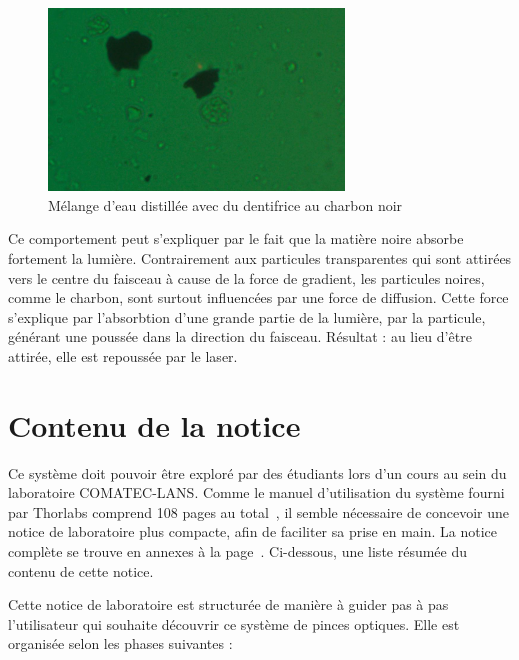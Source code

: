 \begin{figure}[H]
    \begin{center}
        \includegraphics[width=0.7\textwidth]{assets/figures/Notice de laboratoire/dentifrice_charbon.png}
    \end{center}
    \caption{Mélange d'eau distillée avec du dentifrice au charbon noir}
    \label{dentifrice_charbon}
\end{figure}

Ce comportement peut s'expliquer par le fait que la matière noire absorbe fortement la lumière. Contrairement aux particules transparentes qui sont attirées vers le centre du faisceau à cause de la force de gradient, les particules noires, comme le charbon, sont surtout influencées par une force de diffusion. Cette force s'explique par l'absorbtion d'une grande partie de la lumière, par la particule, générant une poussée dans la direction du faisceau. Résultat : au lieu d'être attirée, elle est repoussée par le laser.

\newpage
\section{Contenu de la notice}
Ce système doit pouvoir être exploré par des étudiants lors d'un cours au sein du laboratoire COMATEC-LANS. Comme le manuel d'utilisation du système fourni par Thorlabs comprend 108 pages au total~\cite{manualPortableOpticalTweezers}, il semble nécessaire de concevoir une notice de laboratoire plus compacte, afin de faciliter sa prise en main. La notice complète se trouve en annexes à la page~\pageref{annexe:notice_labo_Kinesis_ThorCam}. Ci-dessous, une liste résumée du contenu de cette notice.

Cette notice de laboratoire est structurée de manière à guider pas à pas l'utilisateur qui souhaite découvrir ce système de pinces optiques.
Elle est organisée selon les phases suivantes :

